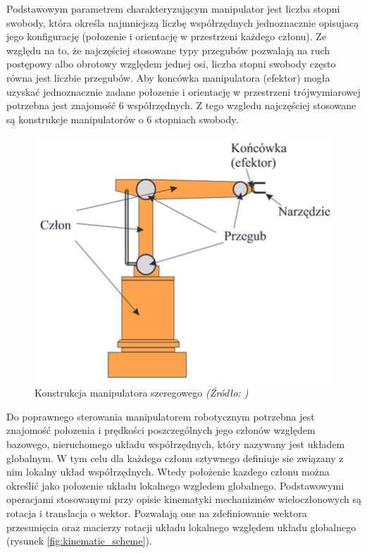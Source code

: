 \documentclass[a4paper, 12pt, twoside]{article}
\begin{document}
Podstawowym parametrem charakteryzującym manipulator jest liczba stopni swobody, która określa najmniejszą liczbę współrzędnych jednoznacznie opisujacą jego konfigurację (połozenie i orientację w przestrzeni każdego członu). Ze względu na to, że najczęściej stosowane typy przegubów pozwalają na ruch postępowy albo obrotowy względem jednej osi, liczba stopni swobody
często równa jest liczbie przegubów. Aby koncówka manipulatora (efektor) mogła uzyskać jednoznacznie zadane połozenie i orientację w przestrzeni trójwymiarowej potrzebna jest znajomość 6 współrzędnych. Z tego wzgledu najczęściej stosowane są konstrukcje manipulatorów o 6 stopniach swobody.

\begin{figure}[H]
\centering
\includegraphics[width=0.6\linewidth]{images/manipulator_scheme.png}
\caption{Konstrukcja manipulatora szeregowego\textit{ (Źródło: \cite{lectures}) } }
\label{fig:manipulator_scheme}
\end{figure}

Do poprawnego sterowania manipulatorem robotycznym potrzebna jest znajomość połozenia i prędkości poszczególnych jego członów względem bazowego, nieruchomego układu współrzędnych, który nazywany jest układem globalnym. W tym celu dla każdego członu sztywnego definiuje sie związany z nim lokalny układ współrzędnych. Wtedy położenie kazdego członu można określić jako połozenie układu lokalnego wzgledem globalnego. Podstawowymi operacjami stosowanymi przy opisie kinematyki mechanizmów wieloczłonowych są rotacja i translacja o wektor. Pozwalają one na zdefiniowanie wektora przesunięcia oraz macierzy rotacji układu lokalnego
względem układu globalnego (rysunek \ref{fig:kinematic_scheme}).
\end{document}
